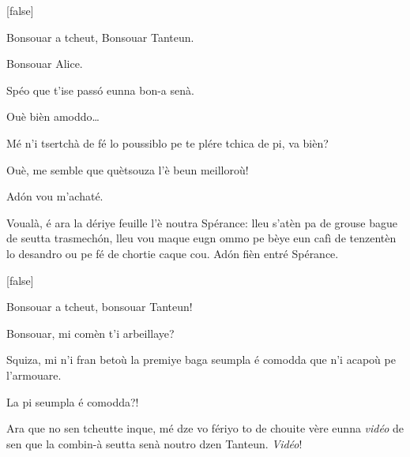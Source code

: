 \begin{drama}
[false]%
\vspace*{-6pt}


\Alicespeaks {} Bonsouar a tcheut, Bonsouar Tanteun. 

\Tanteunspeaks Bonsouar Alice.

\Alicespeaks Spéo que t'ise pass\'o eunna bon-a senà.

\Tanteunspeaks Ouè bièn amoddo\ldots

\Alicespeaks Mé n'i tsertchà de fé lo poussiblo pe te plére tchica de pi, va bièn?

\Tanteunspeaks{} Ouè, me semble que què\-tsouza l'è beun meilloroù!

\Alicespeaks Ad\'on vou m'achaté.


\Mariespeaks{} Voualà, é ara la dériye feuille l'è noutra Spérance: lleu s'atèn pa de grouse bague de seutta trasmech\'on,  lleu vou maque eugn ommo pe bèye eun cafì de tenzentèn lo desandro ou pe fé de chortie caque cou. Ad\'on fièn entré Spérance.

{}[false]%
\vspace*{-6pt}


\Sperancespeaks Bonsouar a tcheut, bonsouar Tanteun!

\Tanteunspeaks{} Bonsouar, mi comèn t'i ar\-be\-illaye?

\Sperancespeaks Squiza, mi n'i fran betoù la premiye baga seumpla é comodda que n'i acapoù pe l'armouare.

\Tanteunspeaks La pi seumpla é comodda?!



\Mariespeaks Ara que no sen tcheutte inque, mé dze vo fériyo to de chouite vère eunna \textit{vidéo} de sen que la combin-à seutta senà noutro dzen Tanteun. \textit{Vidéo}!


\end{drama}
